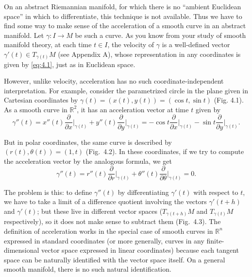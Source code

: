 On an abstract Riemannian manifold, for which there is no ``ambient Euclidean space'' in which to differentiate, this technique is not available. Thus we have to find some way to make sense of the acceleration of a smooth curve in an abstract manifold. Let $\gamma: I \to M$ be such a curve. As you know from your study of smooth manifold theory, at each time $t \in I$, the velocity of $\gamma$ is a well-defined vector $\gamma'(t) \in T_{\gamma(t)} M$ (see Appendix A), whose representation in any coordinates is given by \eqref{eq:4.1}, just as in Euclidean space.

However, unlike velocity, acceleration has no such coordinate-independent interpretation. For example, consider the parametrized circle in the plane given in Cartesian coordinates by $\gamma(t) = (x(t), y(t)) = (\cos t, \sin t)$ (Fig. 4.1). As a smooth curve in $\mathbb{R}^2$, it has an acceleration vector at time $t$ given by
\[
\gamma''(t) = x''(t) \frac{\partial}{\partial x}\bigg|_{\gamma(t)} + y''(t) \frac{\partial}{\partial y}\bigg|_{\gamma(t)}
= -\cos t \frac{\partial}{\partial x}\bigg|_{\gamma(t)} - \sin t \frac{\partial}{\partial y}\bigg|_{\gamma(t)}.
\]


But in polar coordinates, the same curve is described by $(r(t), \theta(t)) = (1, t)$ (Fig.\ 4.2). In these coordinates, if we try to compute the acceleration vector by the analogous formula, we get
\[
\gamma''(t) = r''(t) \frac{\partial}{\partial r}\bigg|_{\gamma(t)} + \theta''(t) \frac{\partial}{\partial \theta}\bigg|_{\gamma(t)} = 0.
\]

The problem is this: to define $\gamma''(t)$ by differentiating $\gamma'(t)$ with respect to $t$, we have to take a limit of a difference quotient involving the vectors $\gamma'(t + h)$ and $\gamma'(t)$; but these live in different vector spaces ($T_{\gamma(t+h)}M$ and $T_{\gamma(t)}M$ respectively), so it does not make sense to subtract them (Fig.\ 4.3). The definition of acceleration works in the special case of smooth curves in $\mathbb{R}^n$ expressed in standard coordinates (or more generally, curves in any finite-dimensional vector space expressed in linear coordinates) because each tangent space can be naturally identified with the vector space itself. On a general smooth manifold, there is no such natural identification.

